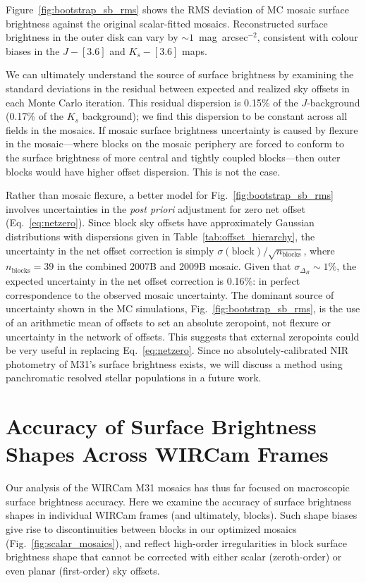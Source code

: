 \documentclass[iop]{emulateapj}
\newcommand{\Fig}[1]{Fig.~\ref{fig:#1}}  %
\newcommand{\Eq}[1]{Eq.~\ref{eq:#1}}  %
\newcommand{\Tab}[1]{Table~\ref{tab:#1}}  %
\begin{document}
Figure~\ref{fig:bootstrap_sb_rms} shows the RMS deviation of MC mosaic surface brightness against the original scalar-fitted mosaics.
Reconstructed surface brightness in the outer disk can vary by $\sim 1$~mag~arcsec$^{-2}$, consistent with colour biases in the $J-[3.6]$ and $K_s-[3.6]$ maps.

We can ultimately understand the source of surface brightness by examining the standard deviations in the residual between expected and realized sky offsets in each Monte Carlo iteration.
This residual dispersion is 0.15\% of the $J$-background (0.17\% of the $K_s$ background); we find this dispersion to be constant across all fields in the mosaics.
If mosaic surface brightness uncertainty is caused by flexure in the mosaic---where blocks on the mosaic periphery are forced to conform to the surface brightness of more central and tightly coupled blocks---then outer blocks would have higher offset dispersion.
This is not the case.

Rather than mosaic flexure, a better model for \Fig{bootstrap_sb_rms} involves uncertainties in the \textit{post priori} adjustment for zero net offset (\Eq{netzero}).
Since block sky offsets have approximately Gaussian distributions with dispersions given in \Tab{offset_hierarchy}, the uncertainty in the net offset correction is simply $\sigma(\mathrm{block})/\sqrt{n_\mathrm{blocks}}$, where $n_\mathrm{blocks}=39$ in the combined 2007B and 2009B mosaic.
Given that $\sigma_{\Delta_B}\sim 1\%$, the expected uncertainty in the net offset correction is 0.16\%: in perfect correspondence to the observed mosaic uncertainty.
The dominant source of uncertainty shown in the MC simulations, \Fig{bootstrap_sb_rms}, is the use of an arithmetic mean of offsets to set an absolute zeropoint, not flexure or uncertainty in the network of offsets.
This suggests that external zeropoints could be very useful in replacing \Eq{netzero}.
Since no absolutely-calibrated NIR photometry of M31's surface brightness exists, we will discuss a method using panchromatic resolved stellar populations in a future work.

\section{Accuracy of Surface Brightness Shapes Across WIRCam Frames}
\label{sec:skyflatstability}

Our analysis of the WIRCam M31 mosaics has thus far focused on macroscopic surface brightness accuracy.
Here we examine the accuracy of surface brightness shapes in individual WIRCam frames (and ultimately, blocks).
Such shape biases give rise to discontinuities between blocks in our optimized mosaics (\Fig{scalar_mosaics}), and reflect high-order irregularities in block surface brightness shape that cannot be corrected with either scalar (zeroth-order) or even planar (first-order) sky offsets.
\end{document}
